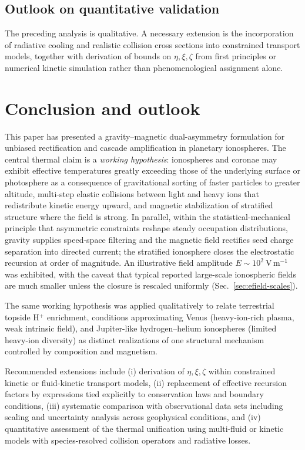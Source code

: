 \documentclass[11pt,a4paper]{article}
\begin{document}
\subsection{Outlook on quantitative validation}
The preceding analysis is qualitative. A necessary extension is the incorporation of radiative cooling and realistic collision cross sections into constrained transport models, together with derivation of bounds on $\eta,\xi,\zeta$ from first principles or numerical kinetic simulation rather than phenomenological assignment alone.

\section{Conclusion and outlook}
This paper has presented a gravity--magnetic dual-asymmetry formulation for unbiased rectification and cascade amplification in planetary ionospheres. The central thermal claim is a \emph{working hypothesis}: ionospheres and coronae may exhibit effective temperatures greatly exceeding those of the underlying surface or photosphere as a consequence of gravitational sorting of faster particles to greater altitude, multi-step elastic collisions between light and heavy ions that redistribute kinetic energy upward, and magnetic stabilization of stratified structure where the field is strong. In parallel, within the statistical-mechanical principle that asymmetric constraints reshape steady occupation distributions, gravity supplies speed-space filtering and the magnetic field rectifies seed charge separation into directed current; the stratified ionosphere closes the electrostatic recursion at order of magnitude. An illustrative field amplitude $E\sim 10^2\ \mathrm{V\,m^{-1}}$ was exhibited, with the caveat that typical reported large-scale ionospheric fields are much smaller unless the closure is rescaled uniformly (Sec.~\ref{sec:efield-scales}).

The same working hypothesis was applied qualitatively to relate terrestrial topside H$^+$ enrichment, conditions approximating Venus (heavy-ion-rich plasma, weak intrinsic field), and Jupiter-like hydrogen--helium ionospheres (limited heavy-ion diversity) as distinct realizations of one structural mechanism controlled by composition and magnetism.

Recommended extensions include (i) derivation of $\eta,\xi,\zeta$ within constrained kinetic or fluid-kinetic transport models, (ii) replacement of effective recursion factors by expressions tied explicitly to conservation laws and boundary conditions, (iii) systematic comparison with observational data sets including scaling and uncertainty analysis across geophysical conditions, and (iv) quantitative assessment of the thermal unification using multi-fluid or kinetic models with species-resolved collision operators and radiative losses.



\end{document}
